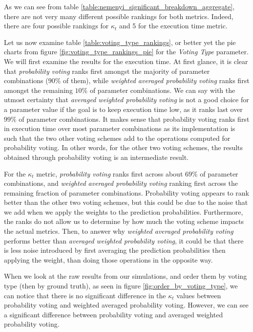 As we can see from table \ref{table:nemenyi_significant_breakdown_aggregate}, there are not very many different possible rankings for both metrics. Indeed, there are four possible rankings for $\kappa_t$ and 5 for the execution time metric.

Let us now examine table \ref{table:voting_type_rankings}, or better yet the pie charts from figure \ref{fig:voting_type_rankings_pie} for the \textit{Voting Type} parameter.
We will first examine the results for the execution time. At first glance, it is clear that \textit{probability voting} ranks first amongst the majority of parameter combinations ($90\%$ of them), while \textit{weighted averaged probability voting} ranks first amongst the remaining $10\%$ of parameter combinations. We can say with the utmost certainty that \textit{averaged weighted probability voting} is not a good choice for a parameter value if the goal is to keep execution time low, as it ranks last over $99\%$ of parameter combinations. It makes sense that probability voting ranks first in execution time over most parameter combinations as its implementation is such that the two other voting schemes add to the operations computed for probability voting. In other words, for the other two voting schemes, the results obtained through probability voting is an intermediate result.

For the $\kappa_t$ metric, \textit{probability voting} ranks first across about $69\%$ of parameter combinations, and \textit{weighted averaged probability voting} ranking first across the remaining fraction of parameter combinations. Probability voting appears to rank better than the other two voting schemes, but this could be due to the noise that we add when we apply the weights to the prediction probabilities. Furthermore, the ranks do not allow us to determine by how much the voting scheme impacts the actual metrics. Then, to answer why \textit{weighted averaged probability voting} performs better than \textit{averaged weighted probability voting}, it could be that there is less noise introduced by first averaging the prediction probabilities then applying the weight, than doing those operations in the opposite way.

When we look at the raw results from our simulations, and order them by voting type (then by ground truth), as seen in figure \ref{fig:order_by_voting_type}, we can notice that there is no significant difference in the $\kappa_t$ values between probability voting and weighted averaged probability voting. However, we can see a significant difference between probability voting and averaged weighted probability voting.

